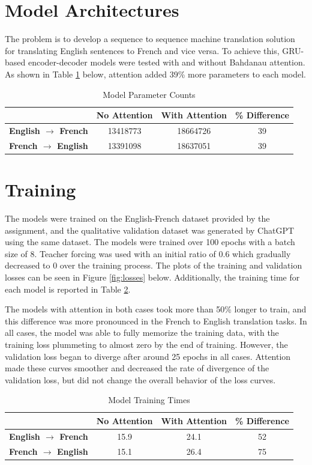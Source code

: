 \documentclass{article}
\begin{document}

\raggedright

\section{Model Architectures}
The problem is to develop a sequence to sequence machine
translation solution for translating English sentences to
French and vice versa. To achieve this, GRU-based
encoder-decoder models were tested with and without Bahdanau
attention. As shown in Table \ref{tab:complexities} below,
attention added 39\% more parameters to each model. 
\begin{table}[h]
    \begin{tabular}{|c|c|c|c|}
        \hline
        & \textbf{No Attention} & \textbf{With Attention} & \textbf{\% Difference} \\
        \hline
        \textbf{English $\rightarrow$ French} & 13418773 & 18664726 & 39 \\
        \hline
        \textbf{French $\rightarrow$ English} & 13391098 & 18637051 & 39\\
        \hline
    \end{tabular}
    \caption{Model Parameter Counts}
    \label{tab:complexities}
\end{table}

\section{Training}
The models were trained on the English-French dataset
provided by the assignment, and the qualitative validation
dataset was generated by ChatGPT using the same dataset. The
models were trained over 100 epochs with a batch size of 8.
Teacher forcing was used with an initial ratio of 0.6 which
gradually decreased to 0 over the training process. The
plots of the training and validation losses can be seen in
Figure \ref{fig:losses} below. Additionally, the training
time for each model is reported in Table \ref{tab:time}.

The models with attention in both cases took more than 50\%
longer to train, and this difference was more pronounced in
the French to English translation tasks. In all cases, the
model was able to fully memorize the training data, with the
training loss plummeting to almost zero by the end of
training. However, the validation loss began to diverge
after around 25 epochs in all cases. Attention made these
curves smoother and decreased the rate of divergence of the
validation loss, but did not change the overall behavior of
the loss curves.
\begin{table}[h]
    \begin{tabular}{|c|c|c|c|}
        \hline
        & \textbf{No Attention} & \textbf{With Attention} & \textbf{\% Difference} \\
        \hline
        \textbf{English $\rightarrow$ French} & 15.9 & 24.1 & 52 \\
        \hline
        \textbf{French $\rightarrow$ English} & 15.1 & 26.4 & 75\\
        \hline
    \end{tabular}
    \caption{Model Training Times}
    \label{tab:time}
\end{table}
\newpage
\end{document}
